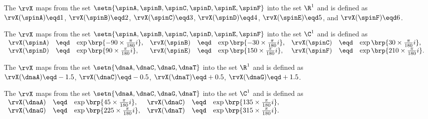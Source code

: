\begin{definition}
\label{def:rv_spinR1}
The  $\rvX$ maps from the set $\setn{\spinA,\spinB,\spinC,\spinD,\spinE,\spinF}$ into the set $\R^1$
and is defined as\footnotemark
\\\indentx
  $\rvX(\spinA)\eqd 1$, 
  $\rvX(\spinB)\eqd 2$, 
  $\rvX(\spinC)\eqd 3$, 
  $\rvX(\spinD)\eqd 4$, 
  $\rvX(\spinE)\eqd 5$, and 
  $\rvX(\spinF)\eqd 6$.
\end{definition}

\begin{definition}
\label{def:rv_spinqpsk}
The  $\rvX$ maps from the set $\setn{\spinA,\spinB,\spinC,\spinD,\spinE,\spinF}$ into the set $\C^1$
and is defined as 
\\\indentx$\begin{array}{rclrclrcl}
    \rvX(\spinA) &\eqd& \exp\brp{-90\times\frac{\pi}{180}i}, 
   &\rvX(\spinB) &\eqd& \exp\brp{-30\times\frac{\pi}{180}i}, 
   &\rvX(\spinC) &\eqd& \exp\brp{ 30\times\frac{\pi}{180}i}, 
  \\\rvX(\spinD) &\eqd& \exp\brp{ 90\times\frac{\pi}{180}i}, 
   &\rvX(\spinE) &\eqd& \exp\brp{150\times\frac{\pi}{180}i},
   &\rvX(\spinF) &\eqd& \exp\brp{210\times\frac{\pi}{180}i}.
\end{array}$
\end{definition}

\begin{definition}
\label{def:rv_dnapam}
The  $\rvX$ maps from the set $\setn{\dnaA,\dnaC,\dnaG,\dnaT}$ into the set $\R^1$
and is defined as\footnotemark
\\\indentx
  $\rvX(\dnaA)\eqd-1.5$, 
  $\rvX(\dnaC)\eqd-0.5$, 
  $\rvX(\dnaT)\eqd+0.5$, 
  $\rvX(\dnaG)\eqd+1.5$. 
\end{definition}

\begin{definition}
\label{def:rv_dnaqpsk}
The  $\rvX$ maps from the set $\setn{\dnaA,\dnaC,\dnaG,\dnaT}$ into the set $\C^1$
and is defined as 
\\\indentx$\begin{array}{rclrcl}
     \rvX(\dnaA) &\eqd& \exp\brp{ 45\times\frac{\pi}{180}i}, 
    &\rvX(\dnaC) &\eqd& \exp\brp{135\times\frac{\pi}{180}i}, 
   \\\rvX(\dnaG) &\eqd& \exp\brp{225\times\frac{\pi}{180}i}, 
    &\rvX(\dnaT) &\eqd& \exp\brp{315\times\frac{\pi}{180}i}.
\end{array}$
\end{definition}

